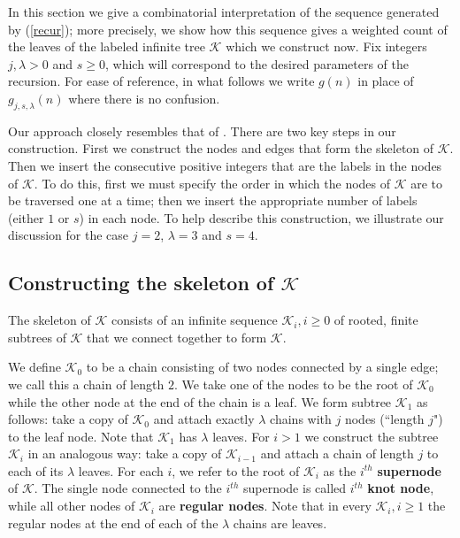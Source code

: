 \documentclass[12pt]{amsart}
\numberwithin{equation}{section}
\numberwithin{theorem}{section}
\numberwithin{table}{section}
\numberwithin{figure}{section}
\begin{document}
In this section we give a combinatorial interpretation of the sequence generated by (\ref{recur}); more precisely, we show how this sequence gives a weighted count of the leaves of the labeled infinite tree ${\mathcal K}$ which we construct now. Fix integers $j,\lambda > 0$ and $s \geq 0$, which will correspond to the desired parameters of the recursion. For ease of reference, in what follows we write $g(n)$ in place of $g_{j,s,\lambda}(n)$ where there is no confusion.

Our approach closely resembles that of \cite{NonHomog}. There are two key steps in our construction. First we construct the nodes and edges that form the skeleton of ${\mathcal K}$. Then we insert the consecutive positive integers that are the labels in the nodes of ${\mathcal K}$. To do this, first we must specify the order in which the nodes of ${\mathcal K}$ are to be traversed one at a time; then we insert the appropriate number of labels (either $1$ or $s$) in each node. To help describe this construction, we illustrate our discussion for the case $j=2$, $\lambda=3$ and $s=4$.

\subsection*{Constructing the skeleton of ${\mathcal K}$}
The skeleton of ${\mathcal K}$ consists of an infinite sequence ${\mathcal K}_i, i \geq 0$ of rooted, finite subtrees of ${\mathcal K}$ that we connect together to form ${\mathcal K}$.

We define ${\mathcal K}_0$ to be a chain consisting of two nodes connected by a single edge; we call this a chain of length $2$. We take one of the nodes to be the root of ${\mathcal K}_0$ while the other node at the end of the chain is a leaf. We form subtree ${\mathcal K}_1$ as follows: take a copy of ${\mathcal K}_0$ and attach exactly $\lambda$ chains with $j$ nodes (``length $j$") to the leaf node. Note that ${\mathcal K}_1$ has $\lambda$ leaves. For $i > 1$ we construct the subtree ${\mathcal K}_i$ in an analogous way: take a copy of ${\mathcal K}_{i-1}$ and attach a chain of length $j$ to each of its $\lambda$ leaves. For each $i$, we refer to the root of ${\mathcal K}_i$ as the $i^{th}$ \textbf{supernode} of ${\mathcal K}$. The single node connected to the $i^{th}$ supernode is called $i^{th}$ \textbf{knot node}, while all other nodes of ${\mathcal K}_i$ are \textbf{regular nodes}. Note that in every ${\mathcal K}_i, i \geq 1$ the regular nodes at the end of each of the $\lambda$ chains are leaves.
\end{document}
